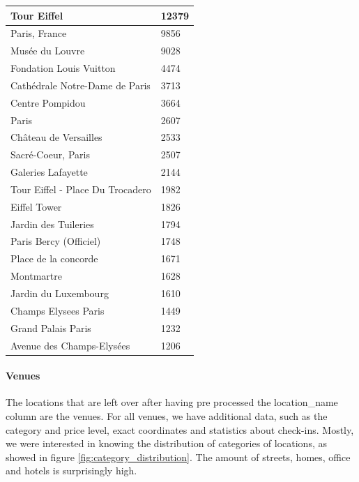 \begin{center}
  \begin{tabular}{| l | l |}
  \hline
  Tour Eiffel & 12379 \\ \hline
  Paris, France & 9856 \\ \hline
  Musée du Louvre & 9028 \\ \hline
  Fondation Louis Vuitton & 4474 \\ \hline
  Cathédrale Notre-Dame de Paris & 3713 \\ \hline
  Centre Pompidou & 3664 \\ \hline
  Paris & 2607 \\ \hline
  Château de Versailles & 2533 \\ \hline
  Sacré-Coeur, Paris & 2507 \\ \hline
  Galeries Lafayette & 2144 \\ \hline
  Tour Eiffel - Place Du Trocadero & 1982 \\ \hline
  Eiffel Tower & 1826 \\ \hline
  Jardin des Tuileries & 1794 \\ \hline
  Paris Bercy (Officiel) & 1748 \\ \hline
  Place de la concorde & 1671 \\ \hline
  Montmartre & 1628 \\ \hline
  Jardin du Luxembourg & 1610 \\ \hline
  Champs Elysees Paris & 1449 \\ \hline
  Grand Palais Paris & 1232 \\ \hline
  Avenue des Champs-Elysées & 1206 \\ \hline
  \end{tabular}
\end{center}

\paragraph{Venues} The locations that are left over after having pre processed the location\_name column are the venues. For all venues, we have additional data, such as the category and price level, exact coordinates and statistics about check-ins. Mostly, we were interested in knowing the distribution of categories of locations, as showed in figure \ref{fig:category_distribution}. The amount of streets, homes, office and hotels is surprisingly high.

